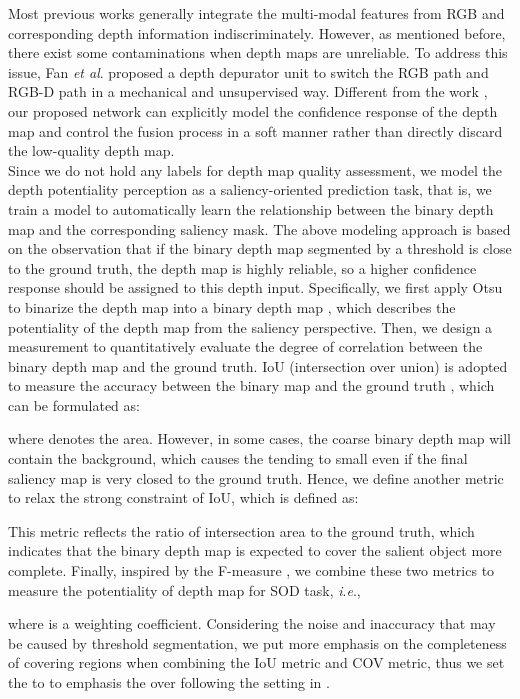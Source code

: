 \documentclass[journal]{IEEEtran}
\newcommand{\etal}{\textit{et al}.}
\newcommand{\ie}{\textit{i}.\textit{e}.}
\begin{document}
Most previous works \cite{han2017cnns,zhu2019pdnet,chen2018progressively,zhao2019contrast,Piao_2019_ICCV} generally integrate the multi-modal features from RGB and corresponding depth information indiscriminately. However, as mentioned before, there exist some contaminations when depth maps are unreliable. To address this issue, Fan \etal \cite{fan2019D3Net} proposed a depth depurator unit to switch the RGB path and RGB-D path in a mechanical and unsupervised way. Different from the work \cite{fan2019D3Net}, our proposed network can explicitly model the confidence response of the depth map and control the fusion process in a soft manner rather than directly discard the low-quality depth map.\\
\indent Since we do not hold any labels for depth map quality assessment, we model the depth potentiality perception as a saliency-oriented prediction task, that is, we train a model to automatically learn the relationship between the binary depth map and the corresponding saliency mask. The above modeling approach is based on the observation that if the binary depth map segmented by a threshold is close to the ground truth, the depth map is highly reliable, so a higher confidence response should be assigned to this depth input. Specifically, we first apply Otsu \cite{otsu1979threshold} to binarize the depth map  into a binary depth map , which describes the potentiality of the depth map from the  saliency perspective. Then, we design a measurement to quantitatively evaluate the degree of correlation between the binary depth map and the ground truth. IoU (intersection over union) is adopted to measure the accuracy between the binary map  and the ground truth , which can be formulated as:

where  denotes the area.
However, in some cases, the coarse binary depth map will contain the background, which causes the  tending to small even if the final saliency map is very closed to the ground truth. Hence, we define another metric to relax the strong constraint of IoU, which is defined as:

This metric  reflects the ratio of intersection area to the ground truth, which indicates that the binary depth map is expected to cover the salient object more complete.
Finally, inspired by the F-measure \cite{achanta2009frequency}, we combine these two metrics to measure the potentiality of depth map for SOD task, \ie,

where  is a weighting coefficient. Considering the noise and inaccuracy that may be caused by threshold segmentation, we put more emphasis on the completeness of covering regions when combining the IoU metric and COV metric, thus we set the  to  to emphasis the  over  following the setting in \cite{achanta2009frequency}.\\
\end{document}
